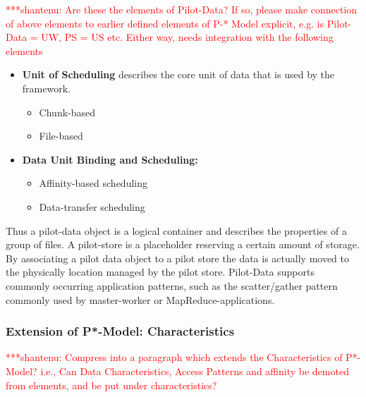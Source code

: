 \documentclass[conference,final]{IEEEtran}
\newcommand{\jhanote}[1]{ {\textcolor{red} { ***shantenu: #1 }}}
\newcommand{\alnote}[1]{ {\textcolor{blue} { ***andre: #1 }}}
\newcommand{\alnote}[1]{}
\newcommand{\jhanote}[1]{}
\begin{document}
\jhanote{Are these the elements of Pilot-Data? If so, please make
  connection of above elements to earlier defined elements of P-*
  Model explicit, e.g. is Pilot-Data = UW, PS = US etc. Either way,
  needs integration with the following elements}

\begin{itemize}
   \item \textbf{Unit of Scheduling} describes the core unit of data
that is used by the framework.
   \begin{itemize}
        \item Chunk-based
        \item File-based
    \end{itemize}

   \item \textbf{Data Unit Binding and Scheduling:}
   \begin{itemize}
        \item Affinity-based scheduling
        \item Data-transfer scheduling
    \end{itemize}
\end{itemize}

Thus a pilot-data object is a logical container and describes the
properties of a group of files. A pilot-store is a placeholder
reserving a certain amount of storage. By associating a pilot data
object to a pilot store the data is actually moved to the physically
location managed by the pilot store.  Pilot-Data supports commonly
occurring application patterns, such as the scatter/gather pattern
commonly used by master-worker or MapReduce-applications.


\subsubsection*{Extension of P*-Model: Characteristics}

\jhanote{Compress into a paragraph which extends the Characteristics
  of P*-Model? i.e., Can Data Characteristics, Access Patterns and
  affinity be demoted from elements, and be put under
  characteristics?}
\end{document}
